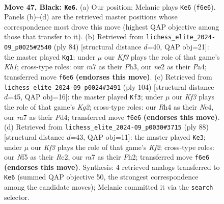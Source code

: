 \documentclass[11pt]{article}
\begin{document}
\clearpage

\begin{figure}[p]\centering
\begin{subfigure}{0.46\textwidth}\centering
\resizebox{\linewidth}{!}{%
\newchessgame
\chessboard[
  setfen={4r3/R7/3p1kp1/5n1p/7r/1p6/3RNKP1/8 b - - 1 47},
  showmover=false,
  pgfstyle=straightmove, color=movearrow, markmove={f6-e6}
]}
\caption{}
\end{subfigure}\hfill
\begin{subfigure}{0.46\textwidth}\centering
\resizebox{\linewidth}{!}{%
\newchessgame
\chessboard[
  setfen={8/r4b2/1NR4p/2P2k2/PP6/4p2P/6P1/7K w - - 0 43},
  showmover=false,
  pgfstyle=straightmove, color=movearrow, markmove={h1-g1}
]}
\caption{}
\end{subfigure}
\\[4pt]
\begin{subfigure}{0.46\textwidth}\centering
\resizebox{\linewidth}{!}{%
\newchessgame
\chessboard[
  setfen={8/8/r3pk1p/8/2NP1P2/1P2R1P1/6K1/8 w - - 5 53},
  showmover=false,
  pgfstyle=straightmove, color=movearrow, markmove={g2-f3}
]}
\caption{}
\end{subfigure}\hfill
\begin{subfigure}{0.46\textwidth}\centering
\resizebox{\linewidth}{!}{%
\newchessgame
\chessboard[
  setfen={r3n3/P2k3p/6p1/1N2p3/4P3/5P2/2R2KPP/8 w - - 3 45},
  showmover=false,
  pgfstyle=straightmove, color=movearrow, markmove={f2-e3}
]}
\caption{}
\end{subfigure}
\caption{\textbf{Move 47, Black: \texttt{Ke6}.} (a) Our position; Melanie plays \texttt{Ke6} (\texttt{f6e6}). Panels (b)--(d) are the retrieved master positions whose correspondence most drove this move (highest QAP objective among those that transfer to it). (b) Retrieved from \texttt{lichess\_elite\_2024-09\_p0025\#2540} (ply 84) [structural distance $d$=40, QAP obj=21]: the master played \texttt{Kg1}; under $\mu$ our \emph{Kf3} plays the role of that game's \emph{Kh1}; cross-type roles: our \emph{r}a7 as their \emph{P}h3, our \emph{n}e2 as their \emph{P}a4; transferred move \texttt{f6e6} \textbf{(endorses this move)}. (c) Retrieved from \texttt{lichess\_elite\_2024-09\_p0024\#3491} (ply 104) [structural distance $d$=45, QAP obj=16]: the master played \texttt{Kf3}; under $\mu$ our \emph{Kf3} plays the role of that game's \emph{Kg2}; cross-type roles: our \emph{R}h4 as their \emph{N}c4, our \emph{r}a7 as their \emph{P}d4; transferred move \texttt{f6e6} \textbf{(endorses this move)}. (d) Retrieved from \texttt{lichess\_elite\_2024-09\_p0030\#3715} (ply 88) [structural distance $d$=43, QAP obj=11]: the master played \texttt{Ke3}; under $\mu$ our \emph{Kf3} plays the role of that game's \emph{Kf2}; cross-type roles: our \emph{N}f5 as their \emph{R}c2, our \emph{r}a7 as their \emph{P}h2; transferred move \texttt{f6e6} \textbf{(endorses this move)}. Synthesis: 4 retrieved analogs transferred to \texttt{Ke6} (summed QAP objective 50, the strongest correspondence among the candidate moves); Melanie committed it via the \texttt{search} selector.}
\label{fig:thought-m93}
\end{figure}
\end{document}
